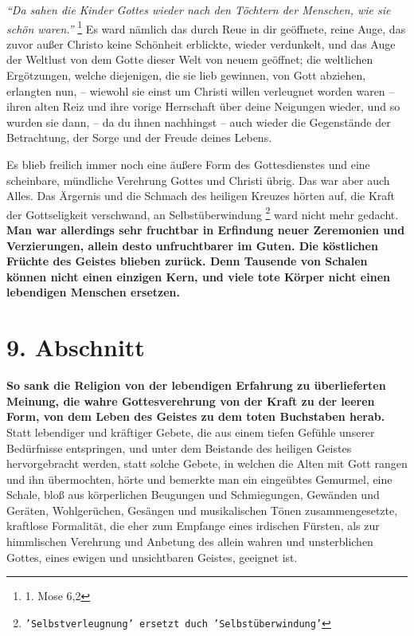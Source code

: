 \textit{"`Da sahen die Kinder Gottes wieder nach den Töchtern der
Menschen, wie sie schön waren."'}
\footnote{1. Mose 6,2}
Es ward nämlich das durch
Reue in dir geöffnete, reine Auge, das zuvor außer Christo keine Schönheit
erblickte, wieder verdunkelt, und das Auge der Weltlust von dem Gotte dieser
Welt von neuem geöffnet; die weltlichen Ergötzungen, welche diejenigen, die sie
lieb gewinnen, von Gott abziehen, erlangten nun, -- wiewohl sie einst um Christi
willen verleugnet worden waren -- ihren alten Reiz und ihre vorige Herrschaft
über deine Neigungen wieder, und so wurden sie dann, -- da du ihnen nachhingst
-- auch wieder die Gegenstände der Betrachtung, der Sorge und der Freude deines
Lebens.

\medskip 

Es blieb freilich immer noch eine äußere Form des Gottesdienstes und eine
scheinbare, mündliche Verehrung Gottes und Christi übrig. Das war aber auch
Alles. Das Ärgernis und die Schmach des heiligen Kreuzes hörten auf, die Kraft
der Gottseligkeit verschwand, an Selbstüberwindung
\footnote{\texttt{'Selbstverleugnung' ersetzt duch 'Selbstüberwindung'}}
ward nicht mehr gedacht. \textbf{Man
war allerdings sehr fruchtbar in Erfindung neuer Zeremonien und Verzierungen,
allein desto unfruchtbarer im Guten. Die köstlichen Früchte des Geistes blieben
zurück. Denn Tausende von Schalen können nicht einen einzigen Kern, und viele
tote Körper nicht einen lebendigen Menschen ersetzen.}

\section{9. Abschnitt}  \label{kap2_ab9}

\label{ref:02_09_lebendige_erfahrung} \textbf{So sank die Religion von der lebendigen Erfahrung zu überlieferten Meinung,
die wahre Gottesverehrung von der Kraft zu der leeren Form, von dem Leben des
Geistes zu dem toten Buchstaben herab.} Statt lebendiger und kräftiger Gebete,
die aus einem tiefen Gefühle unserer Bedürfnisse entspringen, und unter dem
Beistande des heiligen Geistes hervorgebracht werden, statt solche Gebete,
in welchen die Alten mit Gott rangen und ihn übermochten,
hörte und bemerkte man ein
eingeübtes Gemurmel, eine Schale, bloß aus körperlichen Beugungen und
Schmiegungen, Gewänden und Geräten, Wohlgerüchen, Gesängen und musikalischen
Tönen zusammengesetzte, kraftlose Formalität, die eher zum Empfange eines
irdischen Fürsten, als zur himmlischen Verehrung und Anbetung des allein wahren
und unsterblichen Gottes, eines ewigen und unsichtbaren Geistes, geeignet ist.


